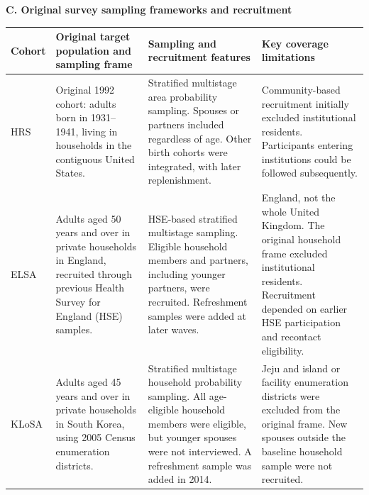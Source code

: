 \begin{table}[!htbp]
\vspace{0.85em}
\parbox{\textwidth}{\raggedright\textbf{C. Original survey sampling frameworks and recruitment}}\par
\vspace{0.2em}
\begin{tabularx}{\textwidth}{@{}L{1.15cm}L{4.35cm}L{5.15cm}Y@{}}
\toprule
Cohort & Original target population and sampling frame & Sampling and recruitment features & Key coverage limitations \\
\midrule
HRS & Original 1992 cohort: adults born in 1931--1941, living in households in the contiguous United States. & Stratified multistage area probability sampling. Spouses or partners included regardless of age. Other birth cohorts were integrated, with later replenishment. & Community-based recruitment initially excluded institutional residents. Participants entering institutions could be followed subsequently. \\
ELSA & Adults aged 50 years and over in private households in England, recruited through previous Health Survey for England (HSE) samples. & HSE-based stratified multistage sampling. Eligible household members and partners, including younger partners, were recruited. Refreshment samples were added at later waves. & England, not the whole United Kingdom. The original household frame excluded institutional residents. Recruitment depended on earlier HSE participation and recontact eligibility. \\
KLoSA & Adults aged 45 years and over in private households in South Korea, using 2005 Census enumeration districts. & Stratified multistage household probability sampling. All age-eligible household members were eligible, but younger spouses were not interviewed. A refreshment sample was added in 2014. & Jeju and island or facility enumeration districts were excluded from the original frame. New spouses outside the baseline household sample were not recruited. \\
\bottomrule
\end{tabularx}


\end{table}
